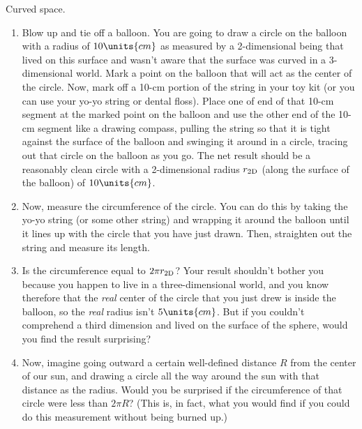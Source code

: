 \begin{aproblem}{Curved space.}
  \begin{enumerate}
  \item Blow up and tie off a balloon.  You are going to draw a circle
    on the balloon with a radius of $10\units{cm}$ as measured by a
    2-dimensional being that lived on this surface and wasn't aware
    that the surface was curved in a 3-dimensional world.  Mark a
    point on the balloon that will act as the center of the circle.
    Now, mark off a 10-cm portion of the string in your toy kit (or
    you can use your yo-yo string or dental floss).  Place one of end
    of that 10-cm segment at the marked point on the balloon and use
    the other end of the 10-cm segment like a drawing compass, pulling
    the string so that it is tight against the surface of the balloon
    and swinging it around in a circle, tracing out that circle on the
    balloon as you go.  The net result should be a reasonably clean
    circle with a 2-dimensional radius $r_{\rm 2D}$ (along the surface
    of the balloon) of $10\units{cm}$.

  \item Now, measure the circumference of the circle.  You can do this
    by taking the yo-yo string (or some other string) and wrapping it
    around the balloon until it lines up with the circle that you have
    just drawn.  Then, straighten out the string and measure its
    length.

  \item Is the circumference equal to $2\pi r_{\rm 2D}$?  Your result
    shouldn't bother you because you happen to live in a
    three-dimensional world, and you know therefore that the {\em
      real} center of the circle that you just drew is inside the
    balloon, so the {\em real} radius isn't $5\units{cm}$.  But if
    you couldn't comprehend a third dimension and lived on the surface
    of the sphere, would you find the result surprising?

  \item Now, imagine going outward a certain well-defined distance $R$
    from the center of our sun, and drawing a circle all the way
    around the sun with that distance as the radius.  Would you be
    surprised if the circumference of that circle were less than $2\pi
    R$?  (This is, in fact, what you would find if you could do this
    measurement without being burned up.)
  
  \end{enumerate}
\end{aproblem}

